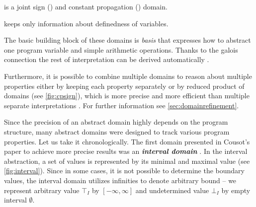 \begin{marginfigure}%
    \centering
{}
    \caption{ is a joint sign () and constant propagation () domain.}
    \label{fig:cpsign}%
\end{marginfigure}%

\begin{marginfigure}%
    \centering
    \caption{ keeps only information about definedness of variables.}
    \label{fig:unitd}%
\end{marginfigure}%

The basic building block of these domains is \emph{basis} that expresses how to
abstract one program variable and simple arithmetic operations. Thanks to
the galois connection the rest of interpretation can be derived automatically
\cite{Mine2004Thesis}.

Furthermore, it is possible to combine multiple domains to
reason about multiple properties either by keeping each property separately or
by reduced product of domains (see \autoref{fig:cpsign}), which is more precise
and more efficient than multiple separate interpretations \cite{Cousot2011b}.
For further information see \autoref{sec:domainrefinement}.

Since the precision of an abstract domain highly depends on the program
structure, many abstract domains were designed to track various program
properties. Let us take it chronologically. The first domain presented in
Cousot's paper \cite{Cousot1977} to achieve more precise results was an
\textbf{\emph{interval domain}} . In the interval abstraction, a set of values
is represented by its minimal and maximal value (see \autoref{fig:interval}).
Since in some cases, it is not possible to determine the boundary values, the
interval domain utilizes infinities to denote arbitrary bound -- we represent
arbitrary value $\top_{\textit{I}}$ by $[-\infty, \infty]$ and undetermined
value $\bot_{\textit{I}}$ by empty interval $\emptyset$.


